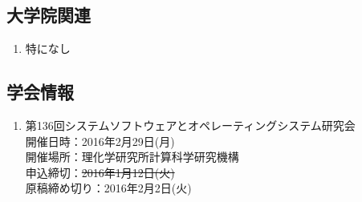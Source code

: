 \documentclass[fleqn, 14pt]{extarticle}
\begin{document}
    \subsection{大学院関連}
    \begin{enumerate}

        \item 特になし
            \hfill
            \label{enum-17}

    \end{enumerate}
    \subsection{学会情報} 
    \begin{enumerate}
        \item 第136回システムソフトウェアとオペレーティングシステム研究会\\
            開催日時：2016年2月29日(月)\\
            開催場所：理化学研究所計算科学研究機構\\
            申込締切：\sout{2016年1月12日(火)}\\
            原稿締め切り：2016年2月2日(火)
    \end{enumerate}

    
\end{document}
